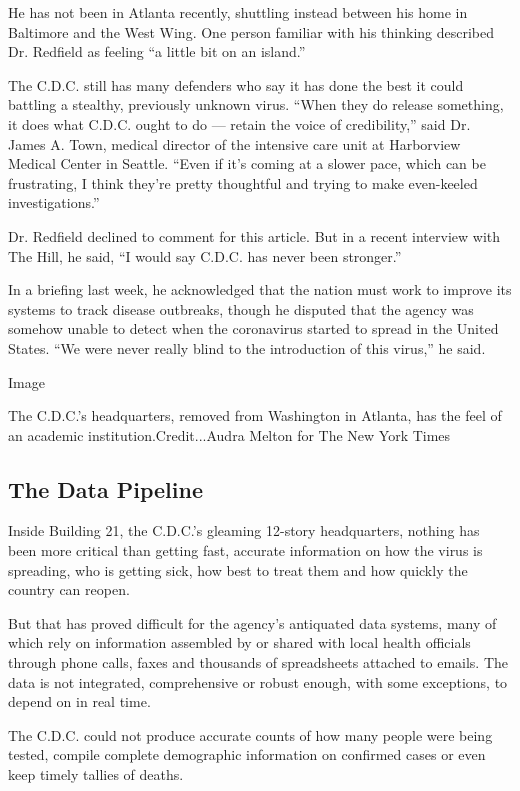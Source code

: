 He has not been in Atlanta recently, shuttling instead between his home
in Baltimore and the West Wing. One person familiar with his thinking
described Dr. Redfield as feeling ``a little bit on an island.''

The C.D.C. still has many defenders who say it has done the best it
could battling a stealthy, previously unknown virus. ``When they do
release something, it does what C.D.C. ought to do --- retain the voice
of credibility,'' said Dr. James A. Town, medical director of the
intensive care unit at Harborview Medical Center in Seattle. ``Even if
it's coming at a slower pace, which can be frustrating, I think they're
pretty thoughtful and trying to make even-keeled investigations.''

Dr. Redfield declined to comment for this article. But in a recent
interview with The Hill, he said, ``I would say C.D.C. has never been
stronger.''

In a briefing last week, he acknowledged that the nation must work to
improve its systems to track disease outbreaks, though he disputed that
the agency was somehow unable to detect when the coronavirus started to
spread in the United States. ``We were never really blind to the
introduction of this virus,'' he said.

Image

The C.D.C.'s headquarters, removed from Washington in Atlanta, has the
feel of an academic institution.Credit...Audra Melton for The New York
Times

\hypertarget{the-data-pipeline}{%
\subsection{The Data Pipeline}\label{the-data-pipeline}}

Inside Building 21, the C.D.C.'s gleaming 12-story headquarters, nothing
has been more critical than getting fast, accurate information on how
the virus is spreading, who is getting sick, how best to treat them and
how quickly the country can reopen.

But that has proved difficult for the agency's antiquated data systems,
many of which rely on information assembled by or shared with local
health officials through phone calls, faxes and thousands of
spreadsheets attached to emails. The data is not integrated,
comprehensive or robust enough, with some exceptions, to depend on in
real time.

The C.D.C. could not produce accurate counts of how many people were
being tested, compile complete demographic information on confirmed
cases or even keep timely tallies of deaths.

